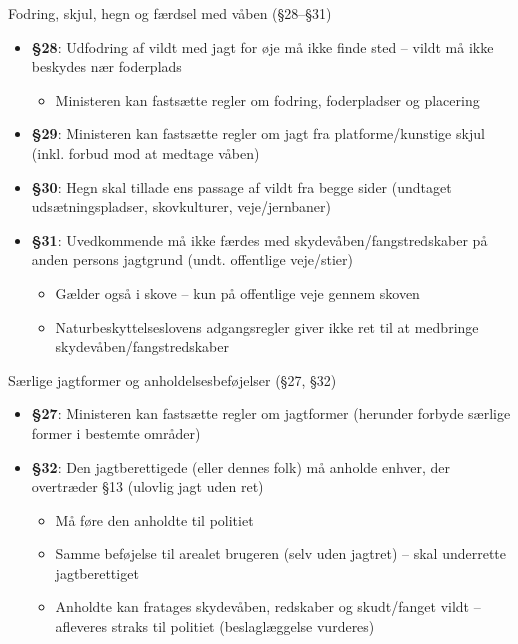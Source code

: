 \begin{frame}{Fodring, skjul, hegn og færdsel med våben (§28–§31)}
    \begin{itemize}
        \item \textbf{§28}: Udfodring af vildt med jagt for øje må ikke finde sted – vildt må ikke beskydes nær foderplads
          \begin{itemize}
            \item Ministeren kan fastsætte regler om fodring, foderpladser og placering
          \end{itemize}
        \item \textbf{§29}: Ministeren kan fastsætte regler om jagt fra platforme/kunstige skjul (inkl. forbud mod at medtage våben)
        \item \textbf{§30}: Hegn skal tillade ens passage af vildt fra begge sider (undtaget udsætningspladser, skovkulturer, veje/jernbaner)
        \item \textbf{§31}: Uvedkommende må ikke færdes med skydevåben/fangstredskaber på anden persons jagtgrund (undt. offentlige veje/stier)
          \begin{itemize}
            \item Gælder også i skove – kun på offentlige veje gennem skoven
            \item Naturbeskyttelseslovens adgangsregler giver ikke ret til at medbringe skydevåben/fangstredskaber
          \end{itemize}
    \end{itemize}
\end{frame}

\begin{frame}{Særlige jagtformer og anholdelsesbeføjelser (§27, §32)}
    \begin{itemize}
        \item \textbf{§27}: Ministeren kan fastsætte regler om jagtformer (herunder forbyde særlige former i bestemte områder)
        \item \textbf{§32}: Den jagtberettigede (eller dennes folk) må anholde enhver, der overtræder §13 (ulovlig jagt uden ret)
          \begin{itemize}
            \item Må føre den anholdte til politiet
            \item Samme beføjelse til arealet brugeren (selv uden jagtret) – skal underrette jagtberettiget
            \item Anholdte kan fratages skydevåben, redskaber og skudt/fanget vildt – afleveres straks til politiet (beslaglæggelse vurderes)
          \end{itemize}
    \end{itemize}
\end{frame}

